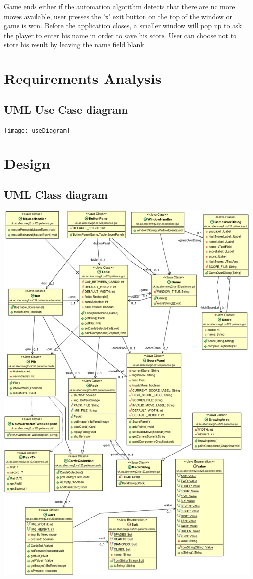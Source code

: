\documentclass[a4paper, 12pt, titlepage]{article}
\begin{document}
Game ends either if the automation algorithm detects that there are no more moves 
available, user presses the 'x' exit button on the top of the window or game is won.
Before the application closes, a smaller window will pop up to ask the player to enter
his name in order to save his score. User can choose not to store his result by leaving
the name field blank.

\newpage

\section{Requirements Analysis}
\subsection{UML Use Case diagram}
\texttt{[image: useDiagram]}

\section{Design}
\subsection{UML Class diagram}
\includegraphics[width=\textwidth]{classDiagram}
\end{document}
